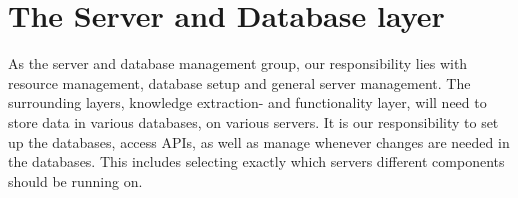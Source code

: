 \section{The Server and Database layer}

As the server and database management group, our responsibility lies with resource management, database setup and general server management. The surrounding layers, knowledge extraction- and functionality layer, will need to store data in various databases, on various servers. It is our responsibility to set up the databases, access APIs, as well as manage whenever changes are needed in the databases. This includes selecting exactly which servers different components should be running on.

